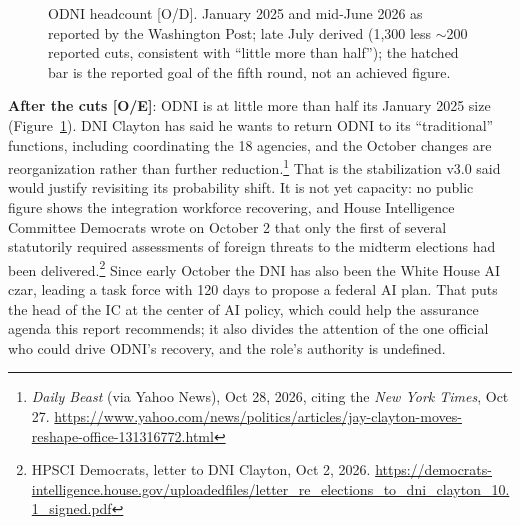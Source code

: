 \documentclass[11pt,letterpaper]{article}
\begin{document}
\begin{figure}[!htbp]
\centering
{}
\caption{ODNI headcount [O/D]. January 2025 and mid-June 2026 as reported by the Washington Post; late July derived (1,300 less $\sim$200 reported cuts, consistent with ``little more than half''); the hatched bar is the reported goal of the fifth round, not an achieved figure.}
\label{fig:odni}
\end{figure}

\textbf{After the cuts [O/E]}: ODNI is at little more than half its January 2025 size (Figure~\ref{fig:odni}). DNI Clayton has said he wants to return ODNI to its ``traditional'' functions, including coordinating the 18 agencies, and the October changes are reorganization rather than further reduction.\footnote{\textit{Daily Beast} (via Yahoo News), Oct 28, 2026, citing the \textit{New York Times}, Oct 27. \url{https://www.yahoo.com/news/politics/articles/jay-clayton-moves-reshape-office-131316772.html}} That is the stabilization v3.0 said would justify revisiting its probability shift. It is not yet capacity: no public figure shows the integration workforce recovering, and House Intelligence Committee Democrats wrote on October 2 that only the first of several statutorily required assessments of foreign threats to the midterm elections had been delivered.\footnote{HPSCI Democrats, letter to DNI Clayton, Oct 2, 2026. \url{https://democrats-intelligence.house.gov/uploadedfiles/letter_re_elections_to_dni_clayton_10.1_signed.pdf}} Since early October the DNI has also been the White House AI czar, leading a task force with 120 days to propose a federal AI plan. That puts the head of the IC at the center of AI policy, which could help the assurance agenda this report recommends; it also divides the attention of the one official who could drive ODNI's recovery, and the role's authority is undefined.
\end{document}
